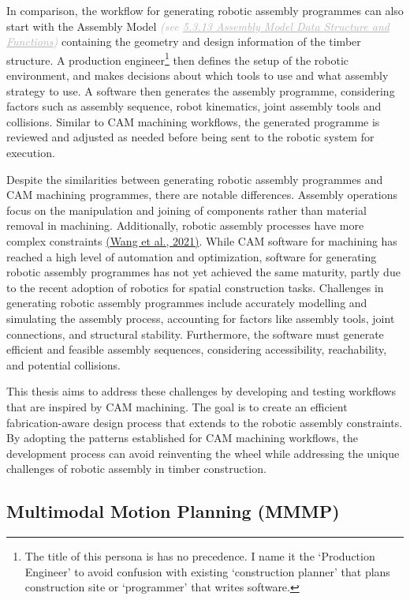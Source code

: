 In comparison, the workflow for generating robotic assembly programmes can also start with the Assembly Model \textit{\textcolor[HTML]{B7B7B7}{(see \uline{5.3.13 Assembly Model Data Structure and Functions})}} containing the geometry and design information of the timber structure. A production engineer\footnote{ The title of this persona is has no precedence. I name it the ‘Production Engineer’ to avoid confusion with existing ‘construction planner’ that plans construction site or ‘programmer’ that writes software.} then defines the setup of the robotic environment, and makes decisions about which tools to use and what assembly strategy to use. A software then generates the assembly programme, considering factors such as assembly sequence, robot kinematics, joint assembly tools and collisions. Similar to CAM machining workflows, the generated programme is reviewed and adjusted as needed before being sent to the robotic system for execution.

Despite the similarities between generating robotic assembly programmes and CAM machining programmes, there are notable differences. Assembly operations focus on the manipulation and joining of components rather than material removal in machining. Additionally, robotic assembly processes have more complex constraints \href{https://www.zotero.org/google-docs/?DQYwa5}{(Wang et al., 2021)}. While CAM software for machining has reached a high level of automation and optimization, software for generating robotic assembly programmes has not yet achieved the same maturity, partly due to the recent adoption of robotics for spatial construction tasks. Challenges in generating robotic assembly programmes include accurately modelling and simulating the assembly process, accounting for factors like assembly tools, joint connections, and structural stability. Furthermore, the software must generate efficient and feasible assembly sequences, considering accessibility, reachability, and potential collisions.

This thesis aims to address these challenges by developing and testing workflows that are inspired by CAM machining. The goal is to create an efficient fabrication-aware design process that extends to the robotic assembly constraints. By adopting the patterns established for CAM machining workflows, the development process can avoid reinventing the wheel while addressing the unique challenges of robotic assembly in timber construction.

\vspace{2\baselineskip}
\subsection{Multimodal Motion Planning (MMMP)}

